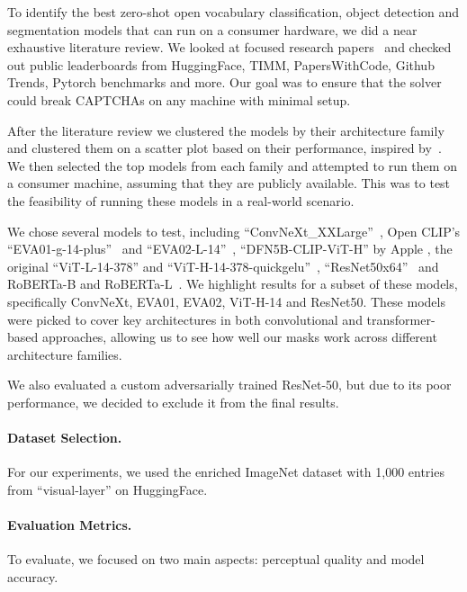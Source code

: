 \documentclass[a4paper, oneside]{discothesis}
\begin{document}
To identify the best zero-shot open vocabulary classification, object detection and segmentation models that can run on a consumer hardware, we did a near exhaustive literature review. We looked at focused research papers~\cite{wang2024benchmarking, goldblum2024battle} and checked out public leaderboards from HuggingFace, TIMM, PapersWithCode, Github Trends, Pytorch benchmarks and more. Our goal was to ensure that the solver could break CAPTCHAs on any machine with minimal setup.

After the literature review we clustered the models by their architecture family and clustered them on a scatter plot based on their performance, inspired by~\cite{howard_image_models}. We then selected the top models from each family and attempted to run them on a consumer machine, assuming that they are publicly available. This was to test the feasibility of running these models in a real-world scenario.

We chose several models to test, including ``ConvNeXt\_XXLarge''~\cite{Liu_2022_CVPR}, Open CLIP's ``EVA01-g-14-plus''~\cite{Fang_2023_CVPR} and ``EVA02-L-14''~\cite{fang2024eva}, ``DFN5B-CLIP-ViT-H'' by Apple \cite{fang2023data}, the original ``ViT-L-14-378'' and ``ViT-H-14-378-quickgelu''~\cite{dosovitskiy2021imageworth16x16words}, ``ResNet50x64''~\cite{He_2015_ICCV} and RoBERTa-B and RoBERTa-L~\cite{conneau2020unsupervisedcrosslingualrepresentationlearning}. We highlight results for a subset of these models, specifically ConvNeXt, EVA01, EVA02, ViT-H-14 and ResNet50. These models were picked to cover key architectures in both convolutional and transformer-based approaches, allowing us to see how well our masks work across different architecture families.

We also evaluated a custom adversarially trained ResNet-50, but due to its poor performance, we decided to exclude it from the final results.

\paragraph{Dataset Selection.}

For our experiments, we used the enriched ImageNet dataset with 1,000 entries from ``visual-layer'' on HuggingFace.

\paragraph{Evaluation Metrics.}

To evaluate, we focused on two main aspects: perceptual quality and model accuracy.
\end{document}
